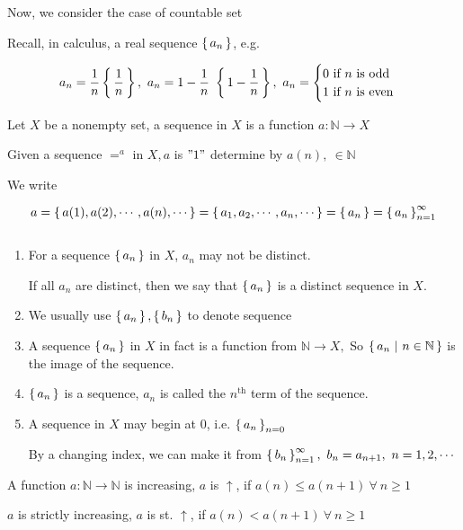 \newpage

Now, we consider the case of countable set

\begin{tcolorbox}
	Recall, in calculus, a real sequence $\left\{ \,a_n \,\right\}$, e.g.
	
	$$a_n = \frac{1}{n}\left\{ \,\frac{1}{n} \,\right\},~a_n = 1 - \frac{1}{n}~\left\{ \,1-\frac{1}{n} \,\right\},~a_n=\begin{cases}
		0 \text{ if } n \text{ is odd}\\1 \text{ if } n \text{ is even}
	\end{cases}$$
\end{tcolorbox}

\begin{defn}
	Let $X$ be a nonempty set, a sequence in $X$ is a function $a:\mathbb N \rightarrow X$

	Given a sequence $=^{a}$ in $X, a$ is $"1"$ determine by $a(n),~ \in \mathbb N$
	
	We write
	
	$$a = \left\{ \,a(1),a(2),\cdots,a(n),\cdots \,\right\} = \left\{ \,a_1,a_2,\cdots,a_n,\cdots \,\right\} = \left\{ \,a_n \,\right\} = \left\{ \,a_n \,\right\}^{\infty}_{n = 1}$$ 

\end{defn}

\begin{rmk*} $ $
	\begin{enumerate}
		\item For a sequence $\left\{ \,a_n \,\right\}$ in $X$, $a_n$ may not be distinct.
		
		If all $a_n$ are distinct, then we say that $\left\{ \,a_n \,\right\}$ is a distinct sequence in $X$.
		
		\item We usually use $\left\{ \,a_n \,\right\},\left\{ \,b_n \,\right\}$ to denote sequence
		\item A sequence $\left\{ \,a_n \,\right\}$ in $X$ in fact is a function from $\mathbb N \rightarrow X,$ So $\left\{ \,a_n~|~n \in \mathbb N \,\right\}$ is the image of the sequence.
		\item $\left\{ \,a_n \,\right\}$ is a sequence, $a_n$ is called the $n^{\text{th}}$ term of the sequence.
		\item A sequence in $X$ may begin at $0$, i.e. $\left\{ \,a_n \,\right\}_{n=0}$
		
		By a changing index, we can make it from $\left\{ \,b_n \,\right\}^{\infty}_{n=1},~b_n = a_{n+1},~n = 1,2,\cdots$ 
	
	\end{enumerate}
\end{rmk*}

\begin{defn}[increasing] $ $\\
	A function $a:\mathbb N \rightarrow \mathbb N$ is increasing, $a$ is $\uparrow$, if $a(n) \leq a(n+1) ~\forall~n \geq 1$
	
	$a$ is strictly increasing, $a$ is st. $\uparrow$, if $a(n) < a(n+1) ~\forall~n \geq 1$
\end{defn}

